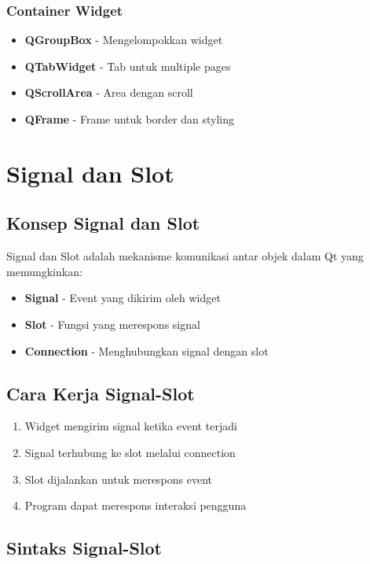 \subsubsection{Container Widget}
\begin{itemize}
\item \textbf{QGroupBox} - Mengelompokkan widget
\item \textbf{QTabWidget} - Tab untuk multiple pages
\item \textbf{QScrollArea} - Area dengan scroll
\item \textbf{QFrame} - Frame untuk border dan styling
\end{itemize}

\section{Signal dan Slot}

\subsection{Konsep Signal dan Slot}

Signal dan Slot adalah mekanisme komunikasi antar objek dalam Qt yang memungkinkan:
\begin{itemize}
\item \textbf{Signal} - Event yang dikirim oleh widget
\item \textbf{Slot} - Fungsi yang merespons signal
\item \textbf{Connection} - Menghubungkan signal dengan slot
\end{itemize}

\subsection{Cara Kerja Signal-Slot}

\begin{enumerate}
\item Widget mengirim signal ketika event terjadi
\item Signal terhubung ke slot melalui connection
\item Slot dijalankan untuk merespons event
\item Program dapat merespons interaksi pengguna
\end{enumerate}

\subsection{Sintaks Signal-Slot}

